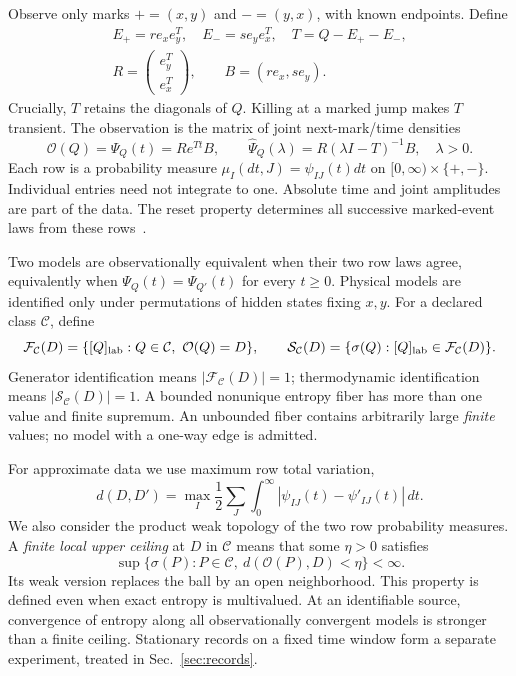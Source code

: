 \documentclass[aps,pre,onecolumn,11pt,longbibliography,notitlepage]{revtex4-2}
\newcommand{\1}{\mathbf 1}
\newcommand{\C}{\mathcal C}
\newcommand{\Obs}{\mathcal O}
\newcommand{\F}{\mathcal F}
\newcommand{\Ent}{\mathcal S}
\newcommand{\sig}{\sigma}
\begin{document}
Observe only marks $+=(x,y)$ and $-=(y,x)$, with known endpoints. Define
\begin{gather}
 E_+=r e_xe_y^T,\quad E_-=s e_ye_x^T,\quad T=Q-E_+-E_-,\\
 R=\begin{pmatrix}e_y^T\\e_x^T\end{pmatrix},\qquad B=(r e_x,s e_y).
\end{gather}
Crucially, $T$ retains the diagonals of $Q$. Killing at a marked jump makes $T$ transient. The observation is the matrix of joint next-mark/time densities
\begin{equation}
 \Obs(Q)=\Psi_Q(t)=R e^{Tt}B,\qquad
 \widehat\Psi_Q(\lambda)=R(\lambda I-T)^{-1}B,\quad\lambda>0.\label{eq:obs}
\end{equation}
Each row is a probability measure $\mu_I(dt,J)=\psi_{IJ}(t)dt$ on $[0,\infty)\times\{+,-\}$. Individual entries need not integrate to one. Absolute time and joint amplitudes are part of the data. The reset property determines all successive marked-event laws from these rows~\cite{vanDerMeer2022,Harunari2022}.

Two models are observationally equivalent when their two row laws agree, equivalently when $\Psi_Q(t)=\Psi_{Q'}(t)$ for every $t\ge0$. Physical models are identified only under permutations of hidden states fixing $x,y$. For a declared class $\C$, define
\begin{equation}
 \F_{\C}(D)=\{[Q]_{\rm lab}:Q\in\C,\ \Obs(Q)=D\},\qquad
 \Ent_{\C}(D)=\{\sig(Q):[Q]_{\rm lab}\in\F_{\C}(D)\}.\label{eq:fibers}
\end{equation}
Generator identification means $|\F_\C(D)|=1$; thermodynamic identification means $|\Ent_\C(D)|=1$. A bounded nonunique entropy fiber has more than one value and finite supremum. An unbounded fiber contains arbitrarily large \emph{finite} values; no model with a one-way edge is admitted.

For approximate data we use maximum row total variation,
\begin{equation}
 d(D,D')=\max_I\frac12\sum_J\int_0^\infty
 |\psi_{IJ}(t)-\psi'_{IJ}(t)|\,dt.\label{eq:tv}
\end{equation}
We also consider the product weak topology of the two row probability measures. A \emph{finite local upper ceiling} at $D$ in $\C$ means that some $\eta>0$ satisfies
\begin{equation}
 \sup\{\sig(P):P\in\C,\ d(\Obs(P),D)<\eta\}<\infty.\label{eq:ceiling}
\end{equation}
Its weak version replaces the ball by an open neighborhood. This property is defined even when exact entropy is multivalued. At an identifiable source, convergence of entropy along all observationally convergent models is stronger than a finite ceiling. Stationary records on a fixed time window form a separate experiment, treated in Sec.~\ref{sec:records}.
\end{document}
